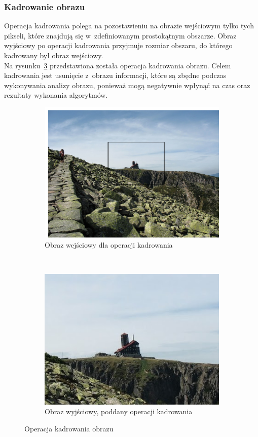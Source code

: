 \subsubsection{Kadrowanie obrazu}
Operacja kadrowania polega na pozostawieniu na obrazie wejściowym tylko tych pikseli, które znajdują się w~zdefiniowanym prostokątnym obszarze. Obraz wyjściowy po operacji kadrowania przyjmuje rozmiar obszaru, do którego kadrowany był obraz wejściowy.\\
Na rysunku~\ref{fig:crop_image} przedstawiona została operacja kadrowania obrazu. Celem kadrowania jest usunięcie z~obrazu informacji, które są zbędne podczas wykonywania analizy obrazu, ponieważ mogą negatywnie wpłynąć na czas oraz rezultaty wykonania algorytmów.
\begin{figure}
  \centering
  \begin{subfigure}[b]{0.45\textwidth}
    \includegraphics[width=\textwidth]{img/crop-image-before}
    \caption{Obraz wejściowy dla operacji kadrowania}
    \label{fig:crop_image_before}
  \end{subfigure}
  ~
  \begin{subfigure}[b]{0.45\textwidth}
    \includegraphics[width=\textwidth]{img/crop-image-after}
    \caption{Obraz wyjściowy, poddany operacji kadrowania}
    \label{fig:crop_image_after}
  \end{subfigure}
  \caption{Operacja kadrowania obrazu}\label{fig:crop_image}
\end{figure}
